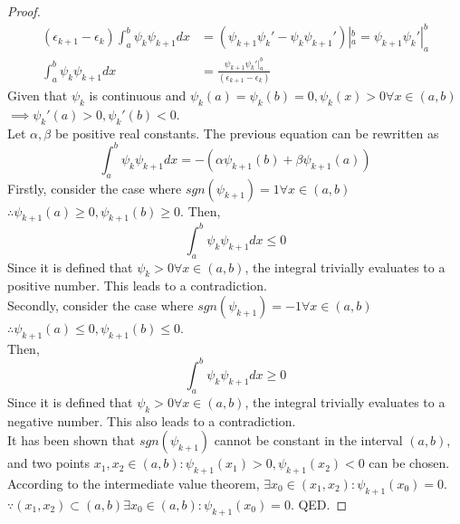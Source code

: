 \begin{sol}
\begin{enumerate}[label=\textbf{(\alph*)}]
\begin{proof}
\begin{align}
    (\epsilon_{k+1}-\epsilon_k)\int_a^b\psi_k\psi_{k+1}dx&=(\psi_{k+1}\psi_k'-\psi_k\psi_{k+1}')|_a^b=\psi_{k+1}\psi_k'|_a^b\\
    \int_a^b\psi_k\psi_{k+1}dx&=\frac{\psi_{k+1}\psi_k'|_a^b}{(\epsilon_{k+1}-\epsilon_k)}
\end{align}
Given that $\psi_k$ is continuous and $\psi_k(a)=\psi_k(b)=0, \psi_k(x)>0\forall x\in(a,b)$\\ 
$\implies\psi_k'(a)>0,\psi_k'(b)<0$.\\
Let $\alpha,\beta$ be positive real constants. The previous equation can be rewritten as
\begin{equation}
    \int_a^b\psi_k\psi_{k+1}dx=-(\alpha\psi_{k+1}(b)+\beta\psi_{k+1}(a))
\end{equation}
Firstly, consider the case where $sgn(\psi_{k+1})=1\forall x\in(a,b)$ $\therefore \psi_{k+1}(a)\geq 0,\psi_{k+1}(b)\geq 0$. Then,
\begin{equation}
    \int_a^b\psi_k\psi_{k+1}dx\leq 0
\end{equation}
Since it is defined that $\psi_{k}>0\forall x\in(a,b)$, the integral trivially evaluates to a positive number. This leads to a contradiction.\\
Secondly, consider the case where  $sgn(\psi_{k+1})=-1\forall x\in(a,b)$ $\therefore \psi_{k+1}(a)\leq 0,\psi_{k+1}(b)\leq 0$. \\Then,
\begin{equation}
    \int_a^b\psi_k\psi_{k+1}dx\geq 0
\end{equation}
Since it is defined that $\psi_{k}>0\forall x\in(a,b)$, the integral trivially evaluates to a negative number. This also leads to a contradiction.\\ It has been shown that $sgn(\psi_{k+1})$ cannot be constant in the interval $(a,b)$, and two points $x_1,x_2\in(a,b):\psi_{k+1}(x_1)>0,\psi_{k+1}(x_2)<0$ can be chosen. According to the intermediate value theorem, $\exists x_0\in(x_1,x_2):\psi_{k+1}(x_0)=0$. $\because(x_1,x_2)\subset(a,b)\exists x_0\in(a,b):\psi_{k+1}(x_0)=0$. QED.
\end{proof}
\end{enumerate}
\end{sol}